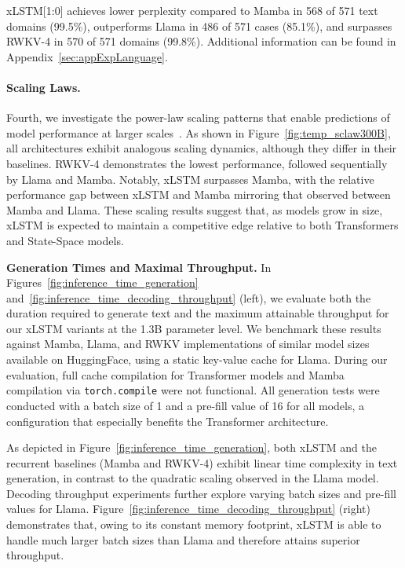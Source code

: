 xLSTM[1:0] achieves lower perplexity compared to Mamba in 568 of 571 text domains (99.5\%), outperforms Llama in 486 of 571 cases (85.1\%), and surpasses RWKV-4 in 570 of 571 domains (99.8\%). Additional information can be found in Appendix~\ref{sec:appExpLanguage}.

\paragraph{Scaling Laws.} Fourth, we investigate the power-law scaling patterns that enable predictions of model performance at larger scales~\citep{Kaplan:20,Brown:20short}. As shown in Figure~\ref{fig:temp_sclaw300B}, all architectures exhibit analogous scaling dynamics, although they differ in their baselines. RWKV-4 demonstrates the lowest performance, followed sequentially by Llama and Mamba. Notably, xLSTM surpasses Mamba, with the relative performance gap between xLSTM and Mamba mirroring that observed between Mamba and Llama. These scaling results suggest that, as models grow in size, xLSTM is expected to maintain a competitive edge relative to both Transformers and State-Space models.

\textbf{Generation Times and Maximal Throughput.} In Figures~\ref{fig:inference_time_generation} and~\ref{fig:inference_time_decoding_throughput} (left), we evaluate both the duration required to generate text and the maximum attainable throughput for our xLSTM variants at the 1.3B parameter level. We benchmark these results against Mamba, Llama, and RWKV implementations of similar model sizes available on HuggingFace, using a static key-value cache for Llama. During our evaluation, full cache compilation for Transformer models and Mamba compilation via \texttt{torch.compile} were not functional. All generation tests were conducted with a batch size of 1 and a pre-fill value of 16 for all models, a configuration that especially benefits the Transformer architecture.

As depicted in Figure~\ref{fig:inference_time_generation}, both xLSTM and the recurrent baselines (Mamba and RWKV-4) exhibit linear time complexity in text generation, in contrast to the quadratic scaling observed in the Llama model. Decoding throughput experiments further explore varying batch sizes and pre-fill values for Llama. Figure~\ref{fig:inference_time_decoding_throughput} (right) demonstrates that, owing to its constant memory footprint, xLSTM is able to handle much larger batch sizes than Llama and therefore attains superior throughput.


